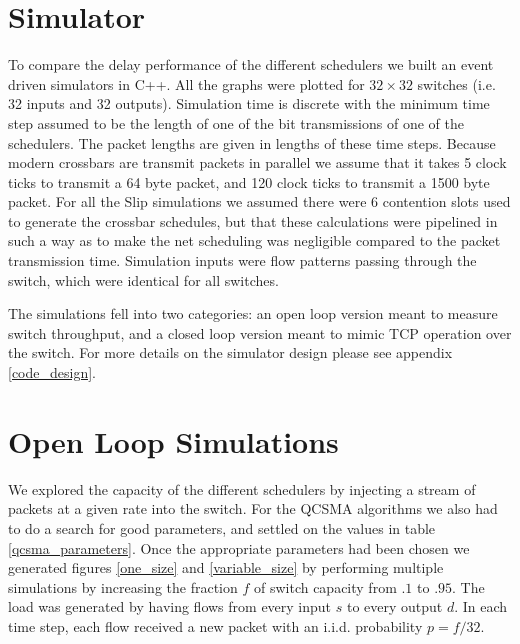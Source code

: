 \documentclass{IEEEtran}%
\begin{document}
\section{Simulator}

To compare the delay performance of the different schedulers we built an event driven simulators in C++.  All the graphs were plotted for $32 \times 32$ switches (i.e. 32 inputs and 32 outputs).  Simulation time is discrete with the minimum time step assumed to be the length of one of the bit transmissions of one of the schedulers.   The packet lengths are given in lengths of these time steps.  Because modern crossbars are transmit packets in parallel we assume that it takes 5 clock ticks to transmit a 64 byte packet, and 120 clock ticks to transmit a 1500 byte packet.  For all the Slip simulations we assumed there were $6$ contention slots used to generate the crossbar schedules, but that these calculations were pipelined in such a way as to make the net scheduling was negligible compared to the packet transmission time.  Simulation inputs were flow patterns passing through the switch, which were identical for all switches. %

 The simulations fell into two categories: an open loop version meant to measure switch throughput, and a closed loop version meant to mimic TCP operation over the switch.  For more details on the simulator design please see appendix \ref{code_design}.%
 
\section{Open Loop Simulations}

We explored the capacity of the different schedulers by injecting a stream of packets at a given rate into the switch.  For the QCSMA algorithms we also had to do a search for good parameters, and settled on the values in table \ref{qcsma_parameters}.  Once the appropriate parameters had been chosen we generated figures \ref{one_size} and \ref{variable_size} by performing multiple simulations by increasing the fraction $f$ of switch capacity from $.1$ to $.95$.  The load was generated by having flows from every input $s$ to every output $d$.  In each time step, each flow received a new packet with an i.i.d. probability $p=f/32$.
\end{document}
